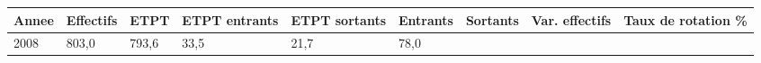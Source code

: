 \begin{longtable}[]{@{}lllllllll@{}}
\toprule
\begin{minipage}[b]{0.05\columnwidth}\raggedright
Annee\strut
\end{minipage} & \begin{minipage}[b]{0.08\columnwidth}\raggedright
Effectifs\strut
\end{minipage} & \begin{minipage}[b]{0.05\columnwidth}\raggedright
ETPT\strut
\end{minipage} & \begin{minipage}[b]{0.10\columnwidth}\raggedright
ETPT entrants\strut
\end{minipage} & \begin{minipage}[b]{0.10\columnwidth}\raggedright
ETPT sortants\strut
\end{minipage} & \begin{minipage}[b]{0.07\columnwidth}\raggedright
Entrants\strut
\end{minipage} & \begin{minipage}[b]{0.07\columnwidth}\raggedright
Sortants\strut
\end{minipage} & \begin{minipage}[b]{0.11\columnwidth}\raggedright
Var. effectifs\strut
\end{minipage} & \begin{minipage}[b]{0.14\columnwidth}\raggedright
Taux de rotation \%\strut
\end{minipage}\tabularnewline
\midrule
\endhead
\begin{minipage}[t]{0.05\columnwidth}\raggedright
2008\strut
\end{minipage} & \begin{minipage}[t]{0.08\columnwidth}\raggedright
803,0\strut
\end{minipage} & \begin{minipage}[t]{0.05\columnwidth}\raggedright
793,6\strut
\end{minipage} & \begin{minipage}[t]{0.10\columnwidth}\raggedright
33,5\strut
\end{minipage} & \begin{minipage}[t]{0.10\columnwidth}\raggedright
21,7\strut
\end{minipage} & \begin{minipage}[t]{0.07\columnwidth}\raggedright
78,0\strut
\end{minipage} & \begin{minipage}[t]{0.07\columnwidth}\raggedright

\end{minipage}
\end{longtable}
